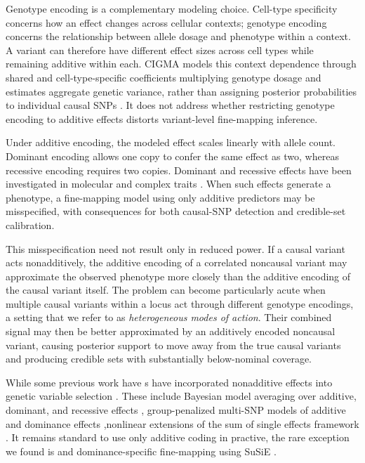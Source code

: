 \documentclass[12pt]{article}
\begin{document}
Genotype encoding is a complementary modeling choice. Cell-type
specificity concerns how an effect changes across cellular contexts;
genotype encoding concerns the relationship between allele dosage
and phenotype within a context. A variant can therefore have different
effect sizes across cell types while remaining additive within each.
CIGMA models this context dependence through shared and cell-type-specific
coefficients multiplying genotype dosage and estimates aggregate genetic
variance, rather than assigning posterior probabilities to individual
causal SNPs \cite{chen_cell_type_specific_2026}. It does not address
whether restricting genotype encoding to additive effects distorts
variant-level fine-mapping inference.

Under additive encoding, the modeled effect scales linearly with
allele count. Dominant encoding allows one copy to confer the same
effect as two, whereas recessive encoding requires two copies.
Dominant and recessive effects have been investigated in molecular
and complex traits \cite{cui_dominance_2023,palmer_analysis_2023}.
When such effects generate a phenotype, a fine-mapping model using
only additive predictors may be misspecified, with consequences for
both causal-SNP detection and credible-set calibration.

This misspecification need not result only in reduced power. If a
causal variant acts nonadditively, the additive encoding of a correlated
noncausal variant may approximate the observed phenotype more closely
than the additive encoding of the causal variant itself. The problem
can become particularly acute when multiple causal variants within a
locus act through different genotype encodings, a setting that we refer
to as \textit{heterogeneous modes of action}. Their combined signal may
then be better approximated by an additively encoded noncausal variant,
causing posterior support to move away from the true causal variants
and producing credible sets with substantially below-nominal coverage.

While some previous work have s have incorporated nonadditive effects into genetic
variable selection \cite{cheng_uncertainty_2022,peltola_bayesian_2012,sabourin_fine-mapping_2015}.
These include Bayesian model
averaging over additive, dominant, and recessive effects \cite{peltola_bayesian_2012}, group-penalized multi-SNP models of
additive and dominance effects \cite{sabourin_fine-mapping_2015},nonlinear extensions of the sum of single effects framework
\cite{cheng_uncertainty_2022}. 
It remains standard to use only additive coding in practive, the rare exception we found is and dominance-specific fine-mapping
using SuSiE \cite{palmer_analysis_2023}. 
\end{document}

